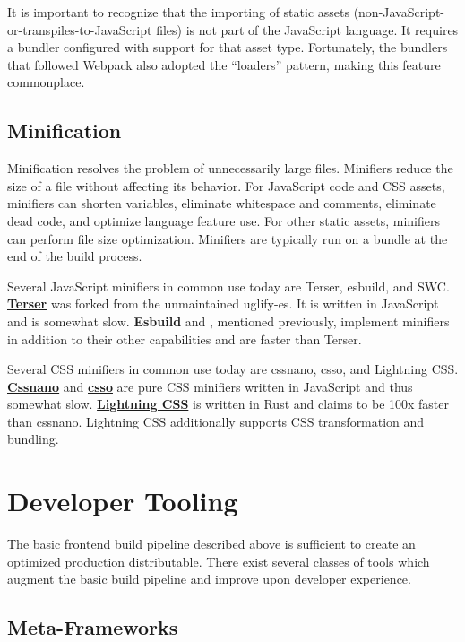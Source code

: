 \documentclass{article}
\begin{document}
It is important to recognize that the importing of static assets
(non-JavaScript-or-transpiles-to-JavaScript files) is not part of the JavaScript language. It
requires a bundler configured with support for that asset type. Fortunately, the bundlers that
followed Webpack also adopted the ``loaders'' pattern, making this feature commonplace.

\subsection{Minification}

Minification resolves the problem of unnecessarily large files. Minifiers reduce the size of a file
without affecting its behavior. For JavaScript code and CSS assets, minifiers can shorten variables,
eliminate whitespace and comments, eliminate dead code, and optimize language feature use. For other
static assets, minifiers can perform file size optimization. Minifiers are typically run on a bundle
at the end of the build process.

Several JavaScript minifiers in common use today are Terser, esbuild, and SWC.
\href{https://terser.org/}{\textbf{Terser}} was forked from the unmaintained uglify-es. It is
written in JavaScript and is somewhat slow. \textbf{Esbuild} and , mentioned previously,
implement minifiers in addition to their other capabilities and are faster than Terser.

Several CSS minifiers in common use today are cssnano, csso, and Lightning CSS.
\href{https://cssnano.github.io/cssnano/}{\textbf{Cssnano}} and
\href{https://github.com/css/csso}{\textbf{csso}} are pure CSS minifiers written in JavaScript and
thus somewhat slow. \href{https://lightningcss.dev/}{\textbf{Lightning CSS}} is written in Rust and
claims to be 100x faster than cssnano. Lightning CSS additionally supports CSS transformation and
bundling.

\section{Developer Tooling}

The basic frontend build pipeline described above is sufficient to create an optimized production
distributable. There exist several classes of tools which augment the basic build pipeline and
improve upon developer experience.

\subsection{Meta-Frameworks}
\end{document}
